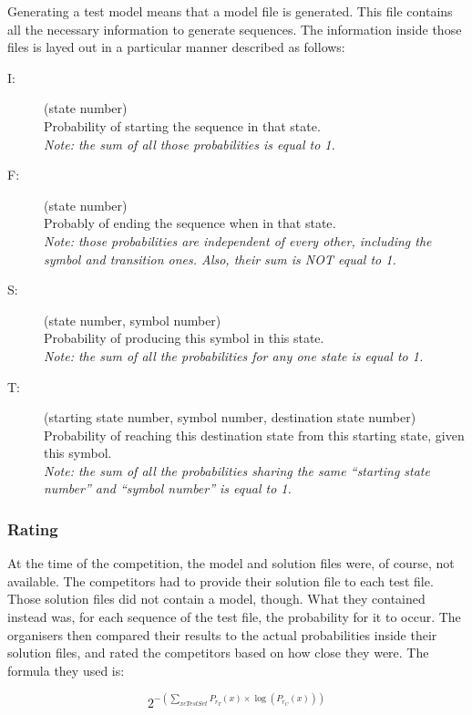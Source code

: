 Generating a test model means that a model file is generated. This
file contains all the necessary information to generate sequences.
The information inside those files is layed out in a particular manner
described as follows:
\begin{description}
\item [{I:}] (state number)\\
Probability of starting the sequence in that state.\\
\textit{Note: the sum of all those probabilities is equal to 1.}
\item [{F:}] (state number)\\
Probably of ending the sequence when in that state\textit{.}\\
\textit{Note: those probabilities are independent of every other,
including the symbol and transition ones. Also, their sum is NOT equal
to 1.}
\item [{S:}] (state number, symbol number)\\
Probability of producing this symbol in this state.\\
\textit{Note: the sum of all the probabilities for any one state is
equal to 1.}
\item [{T:}] (starting state number, symbol number, destination state number)\\
Probability of reaching this destination state from this starting
state, given this symbol.\\
\textit{Note: the sum of all the probabilities sharing the same ``starting
state number'' and ``symbol number'' is equal to 1.}
\end{description}

\subsubsection{Rating}

At the time of the competition, the model and solution files were,
of course, not available. The competitors had to provide their solution
file to each test file. Those solution files did not contain a model,
though. What they contained instead was, for each sequence of the
test file, the probability for it to occur. The organisers then compared
their results to the actual probabilities inside their solution files,
and rated the competitors based on how close they were. The formula
they used is:

\[
2^{-(\sum_{x\epsilon TestSet}P_{r_{T}}(x)\times\log(P_{r_{C}}(x)))}
\]


